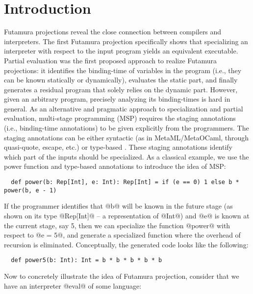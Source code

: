 \section{Introduction} \label{intro}

Futamura projections \cite{Futamura1999, futamura1971partial} reveal the close
connection between compilers and interpreters. The first Futamura projection
specifically shows that specializing an interpreter with respect to the input
program yields an equivalent executable. Partial evaluation
\cite{DBLP:books/daglib/0072559} was the first proposed approach to realize
Futamura projections: it identifies the binding-time of variables in
the program (i.e., they can be known statically or dynamically),
evaluates the static part, and finally generates a residual program that solely
relies on the dynamic part. However, given an arbitrary program, precisely
analyzing its binding-times is hard in general. As an alternative and pragmatic
approach to specialization and partial evaluation, multi-stage programming (MSP) 
\cite{taha1999multi, DBLP:conf/pepm/TahaS97} requires the staging
annotations (i.e., binding-time annotations) to be given explicitly from the
programmers. The staging annotations can be either syntactic (as in
MetaML/MetaOCaml, through quasi-quote, escape, etc.) or type-based \cite{DBLP:conf/gpce/RompfO10}.
These staging annotations identify which part of the inputs should be
specialized. As a classical example, we use the power function and type-based
annotations to introduce the idea of MSP:

\begin{lstlisting}
  def power(b: Rep[Int], e: Int): Rep[Int] = if (e == 0) 1 else b * power(b, e - 1)
\end{lstlisting}

If the programmer identifies that @b@ will be known in the future stage (as shown
on its type @Rep[Int]@ -- a representation of @Int@) and @e@ is known at the
current stage, say 5, then we can specialize the function @power@ with
respect to @e = 5@, and generate a specialized function where the overhead of
recursion is eliminated. Conceptually, the generated code looks like the following:

\begin{lstlisting}
  def power5(b: Int): Int = b * b * b * b * b
\end{lstlisting}

Now to concretely illustrate the idea of Futamura projection, consider that we
have an interpreter @eval@ of some language:

